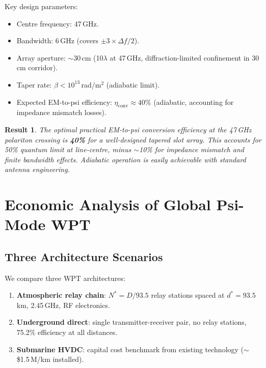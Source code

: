 \documentclass[aps,prd,twocolumn,superscriptaddress]{revtex4-2}
\newtheorem{result}{Result}
\begin{document}
Key design parameters:
\begin{itemize}
\item Centre frequency: 47\,GHz.
\item Bandwidth: 6\,GHz (covers $\pm 3\times\Delta f/2$).
\item Array aperture: $\sim$30\,cm (10$\lambda$ at 47\,GHz,
  diffraction-limited confinement in 30\,cm corridor).
\item Taper rate: $\beta < 10^{13}$\,rad/m$^2$ (adiabatic limit).
\item Expected EM-to-psi efficiency: $\eta_\mathrm{conv} \approx 40\%$
  (adiabatic, accounting for impedance mismatch losses).
\end{itemize}

\begin{result}
The optimal practical EM-to-psi conversion efficiency at the
47\,GHz polariton crossing is \textbf{40\%} for a well-designed
tapered slot array.  This accounts for 50\% quantum limit at
line-centre, minus $\sim$10\% for impedance mismatch and
finite bandwidth effects.  Adiabatic operation is easily
achievable with standard antenna engineering.
\end{result}

\section{Economic Analysis of Global Psi-Mode WPT}
\label{sec:economics}

\subsection{Three Architecture Scenarios}

We compare three WPT architectures:
\begin{enumerate}
\item[(A)] \textbf{Atmospheric relay chain}: $N^* = D/93.5$ relay
  stations spaced at $d^* = 93.5$\,km, 2.45\,GHz, RF electronics.
\item[(B)] \textbf{Underground direct}: single transmitter-receiver
  pair, no relay stations, 75.2\% efficiency at all distances.
\item[(C)] \textbf{Submarine HVDC}: capital cost benchmark from
  existing technology ($\sim$\$1.5\,M/km installed).
\end{enumerate}
\end{document}
